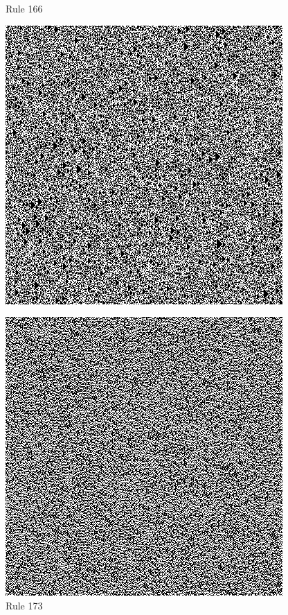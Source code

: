 \documentclass{article}
\begin{document}
\begin{figure}[H]
  \begin{center}
    \begin{minipage}{0.48\textwidth}
      \caption{Rule 166}
      \label{fig:figure8}
      \centering
      \includegraphics[scale=.5]{166.png}
    \end{minipage}
    \begin{minipage}{0.48\textwidth}
      \caption{Rule 173}
      \label{fig:figure9}
      \centering
      \includegraphics[scale=.5]{173.png}
    \end{minipage}
  \end{center}
\end{figure}
\end{document}
